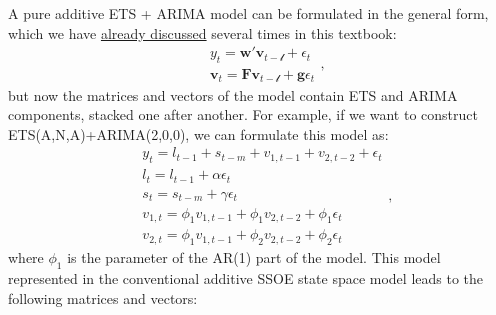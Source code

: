\documentclass[
]{book}
\theoremstyle{definition}
\theoremstyle{definition}
\theoremstyle{definition}
\theoremstyle{definition}
\theoremstyle{remark}
\begin{document}
A pure additive ETS + ARIMA model can be formulated in the general form, which we have \protect\hyperlink{ADAMETSPureAdditive}{already discussed} several times in this textbook:
\begin{equation*}
  \begin{aligned}
    &{y}_{t} = \mathbf{w}' \mathbf{v}_{t-\boldsymbol{\mathscr{l}}} + \epsilon_t \\
    &\mathbf{v}_{t} = \mathbf{F} \mathbf{v}_{t-\boldsymbol{\mathscr{l}}} + \mathbf{g} \epsilon_t
  \end{aligned},
\end{equation*}
but now the matrices and vectors of the model contain ETS and ARIMA components, stacked one after another. For example, if we want to construct ETS(A,N,A)+ARIMA(2,0,0), we can formulate this model as:
\begin{equation}
  \begin{aligned}
    &{y}_{t} = l_{t-1} + s_{t-m} + v_{1,t-1} + v_{2,t-2} + \epsilon_t \\
    &l_t = l_{t-1} + \alpha \epsilon_t \\
    &s_t = s_{t-m} + \gamma \epsilon_t \\
    &v_{1,t} = \phi_1 v_{1,t-1} + \phi_1 v_{2,t-2} + \phi_1 \epsilon_t \\
    &v_{2,t} = \phi_1 v_{1,t-1} + \phi_2 v_{2,t-2} + \phi_2 \epsilon_t 
  \end{aligned},
  \label{eq:ADAMETSARIMAANA100}
\end{equation}
where \(\phi_1\) is the parameter of the AR(1) part of the model. This model represented in the conventional additive SSOE state space model leads to the following matrices and vectors:
\end{document}
